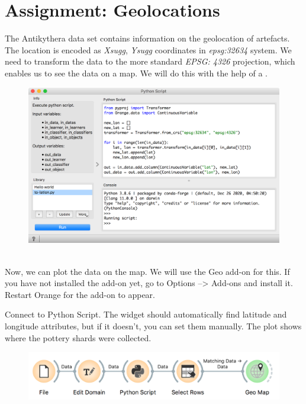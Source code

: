 \chapter{Assignment: Geolocations}
\label{ch:arheo_geolocations}

The Antikythera data set contains information on the geolocation of artefacts. The location is encoded as \textit{Xsugg}, \textit{Ysugg} coordinates in \textit{epsg:32634} system. We need to transform the data to the more standard \textit{EPSG: 4326} projection, which enables us to see the data on a map. We will do this with the help of a .

\begin{figure}[h]
    \centering
    \includegraphics[scale=0.4]{python-script.png}
    \caption{$\;$} %
\end{figure}


Now, we can plot the data on the map. We will use the Geo add-on for this. If you have not installed the add-on yet, go to Options --> Add-ons and install it. Restart Orange for the add-on to appear.

Connect  to Python Script. The widget should automatically find latitude and longitude attributes, but if it doesn't, you can set them manually. The plot shows where the pottery shards were collected.

\begin{figure}[h]
    \centering
    \includegraphics[scale=0.8]{workflow.png}
    \caption{$\;$} %
\end{figure}

